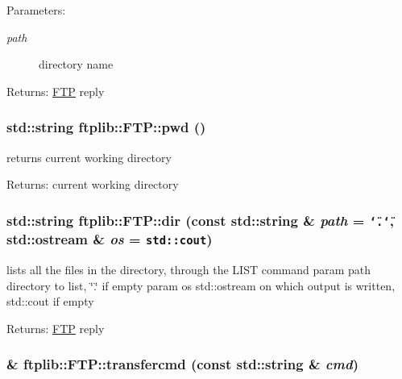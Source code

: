 \begin{Desc}
\item[Parameters:]
\begin{description}
\item[{\em path}]directory name \end{description}
\end{Desc}
\begin{Desc}
\item[Returns:]\hyperlink{classftplib_1_1FTP}{FTP} reply \end{Desc}
\hypertarget{classftplib_1_1FTP_7c01c7b062848c7fc1d3caf95758b109}{
\subsubsection{\setlength{\rightskip}{0pt plus 5cm}std::string ftplib::FTP::pwd ()}}
\label{classftplib_1_1FTP_7c01c7b062848c7fc1d3caf95758b109}


returns current working directory 

\begin{Desc}
\item[Returns:]current working directory \end{Desc}
\hypertarget{classftplib_1_1FTP_42749c4425e33349f605ec0a8b389731}{
\subsubsection{\setlength{\rightskip}{0pt plus 5cm}std::string ftplib::FTP::dir (const std::string \& {\em path} = {\tt \char`\"{}.\char`\"{}}, \/  std::ostream \& {\em os} = {\tt std::cout})}}
\label{classftplib_1_1FTP_42749c4425e33349f605ec0a8b389731}


lists all the files in the directory, through the LIST command param path directory to list, \char`\"{}.\char`\"{} if empty param os std::ostream on which output is written, std::cout if empty 

\begin{Desc}
\item[Returns:]\hyperlink{classftplib_1_1FTP}{FTP} reply \end{Desc}
\hypertarget{classftplib_1_1FTP_c949b3cd7b92534705ff041bb43d989b}{
\subsubsection{ \& ftplib::FTP::transfercmd (const std::string \& {\em cmd})}}
\label{classftplib_1_1FTP_c949b3cd7b92534705ff041bb43d989b}



